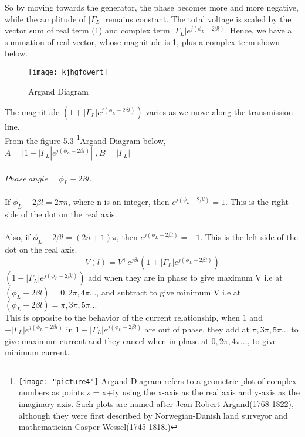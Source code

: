 So by moving towards the generator, the phase becomes more and more negative, while the amplitude of $|\Gamma_L|$ remains constant. The total voltage is scaled by the vector sum of real term (1) and complex term $|\Gamma_L|  e^{j(\phi_L -2 \beta l)}$. Hence, we have a summation of real vector, whose magnitude is 1, plus a complex term shown below. 
	\begin{figure}[h]
		\centering
		\texttt{[image: kjhgfdwert]}
		\caption{Argand Diagram}
		\label{fig:kjhgfdwert}
	\end{figure}
	
The magnitude $( 1+|\Gamma_L|  e^{j(\phi_L -2 \beta l)})$ varies as we move along the transmission line.\\

 From the figure 5.3 \footnote{\texttt{[image: "picture4"]} Argand Diagram refers to a geometric plot of complex numbers as points z = x+iy using the x-axis as the real axis and y-axis as the imaginary axis. Such plots are named after Jean-Robert Argand(1768-1822), although they were first described by Norwegian-Danish land surveyor and mathematician Casper Wessel(1745-1818.)}Argand Diagram below, \\
  $ A =| 1+| \Gamma_L| e^{j (\phi_L - 2\beta l)}|$ \quad \quad$, B=| \Gamma_L|$\\\\
  $Phase\ angle = \phi_L - 2 \beta l$.\\\\
  If $ \phi_L - 2 \beta l = 2 \pi n$, where n is an integer, then $ e^{j(\phi_L - 2 \beta l)} = 1$. This is the right side of the dot on the real axis.\\
\\ Also, if $\phi_L - 2 \beta l=(2 n + 1) \pi$, then $e^{j (\phi_L - 2 \beta l)} = -1$. This is the left side of the dot on the real axis.
	 \begin{equation*}
	 V(l) = V^{+}e^{j\beta l}(1 + |\Gamma_L|  e^{j(\phi_L -2\beta l)})
	 \end{equation*}
	 $(1 + |\Gamma_L|  e^{j(\phi_L -2\beta l)})$
	  add when they are in phase to give maximum V i.e at $(\phi_L -2\beta l) = 0 , 2\pi, 4\pi ...$, and subtract to give minimum V i.e at  $(\phi_L -2\beta l) = \pi , 3\pi, 5\pi ...$ \\
	 This is opposite to the behavior of the current relationship, when 1 and  $-|\Gamma_L|  e^{j(\phi_L -2\beta l)}$ in $1-|\Gamma_L|  e^{j(\phi_L -2\beta l)}$ are out of phase, they add at $\pi, 3\pi, 5\pi...$ to give maximum current and they cancel when in phase at $0, 2\pi , 4\pi...$, to give minimum current.\\
